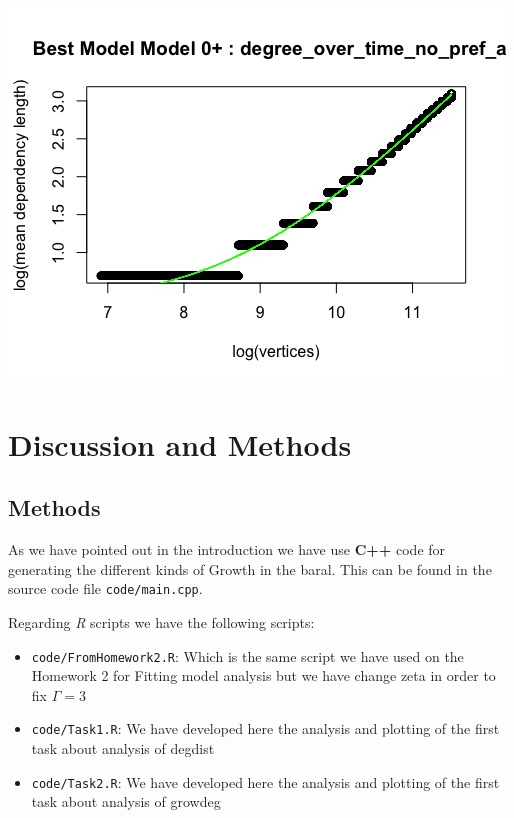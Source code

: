 \documentclass[12pt, a4paper]{article}
\begin{document}
  
  \begin{minipage}[t]{\linewidth}
      \includegraphics[width=\textwidth]{time_growth_degree_best_fit_no_pref_att}
      \captionsetup{type=figure}
      \label{fig:time_growth_degree_best_fit_no_pref_att}
    \end{minipage}
  

\section{Discussion and Methods}
\subsection{Methods}
As we have pointed out in the introduction we have use \textbf{C++} code for generating the different kinds of Growth in the \acrshort{baral}.
This can be found in the source code file \texttt{code/main.cpp}. 

Regarding \textit{R} scripts we have the following scripts:

\begin{itemize}
    \item \texttt{code/FromHomework2.R}: Which is the same script we have used on the Homework 2 for Fitting model analysis but we have change \acrshort{zeta} in order to fix $\Gamma = 3$
    \item \texttt{code/Task1.R}: We have developed here the analysis and plotting of the first task about analysis of \acrshort{degdist}
    \item \texttt{code/Task2.R}: We have developed here the analysis and plotting of the first task about analysis of \acrshort{growdeg}
\end{itemize}
\end{document}
